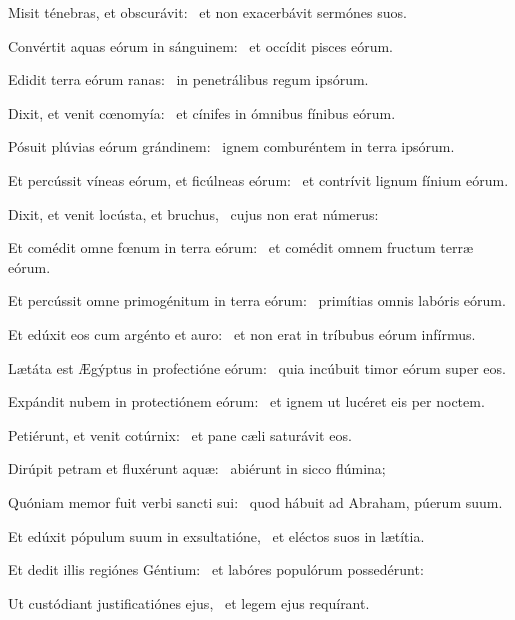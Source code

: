 
\item Misit ténebras, et obscurávit:~\psstar{} et non exacerbávit sermónes suos.

\item Convértit aquas eórum in sánguinem:~\psstar{} et occídit pisces eórum.

\item Edidit terra eórum ranas:~\psstar{} in penetrálibus regum ipsórum.

\item Dixit, et venit cœnomyía:~\psstar{} et cínifes in ómnibus fínibus eórum.

\item Pósuit plúvias eórum grándinem:~\psstar{} ignem comburéntem in terra ipsórum.

\item Et percússit víneas eórum, et ficúlneas eórum:~\psstar{} et contrívit lignum fínium eórum.

\item Dixit, et venit locústa, et bruchus,~\psstar{} cujus non erat númerus:

\item Et comédit omne fœnum in terra eórum:~\psstar{} et comédit omnem fructum terræ eórum.

\item Et percússit omne primogénitum in terra eórum:~\psstar{} primítias omnis labóris eórum.

\item Et edúxit eos cum argénto et auro:~\psstar{} et non erat in tríbubus eórum infírmus.

\item Lætáta est Ægýptus in profectióne eórum:~\psstar{} quia incúbuit timor eórum super eos.

\item Expándit nubem in protectiónem eórum:~\psstar{} et ignem ut lucéret eis per noctem.

\item Petiérunt, et venit cotúrnix:~\psstar{} et pane cæli saturávit eos.

\item Dirúpit petram et fluxérunt aquæ:~\psstar{} abiérunt in sicco flúmina;

\item Quóniam memor fuit verbi sancti sui:~\psstar{} quod hábuit ad Abraham, púerum suum.

\item Et edúxit pópulum suum in exsultatióne,~\psstar{} et eléctos suos in lætítia.

\item Et dedit illis regiónes Géntium:~\psstar{} et labóres populórum possedérunt:

\item Ut custódiant justificatiónes ejus,~\psstar{} et legem ejus requírant.